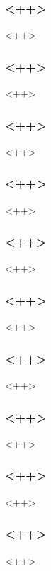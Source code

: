 \begin{frame}[fragile] %
\frametitle{<++>}
<++>
\end{frame}

\begin{frame}[fragile] %
\frametitle{<++>}
<++>
\end{frame}

\begin{frame}[fragile] %
\frametitle{<++>}
<++>
\end{frame}

\begin{frame}[fragile] %
\frametitle{<++>}
<++>
\end{frame}

\begin{frame}[fragile] %
\frametitle{<++>}
<++>
\end{frame}

\begin{frame}[fragile] %
\frametitle{<++>}
<++>
\end{frame}

\begin{frame}[fragile] %
\frametitle{<++>}
<++>
\end{frame}

\begin{frame}[fragile] %
\frametitle{<++>}
<++>
\end{frame}

\begin{frame}[fragile] %
\frametitle{<++>}
<++>
\end{frame}

\begin{frame}[fragile] %
\frametitle{<++>}
<++>
\end{frame}


